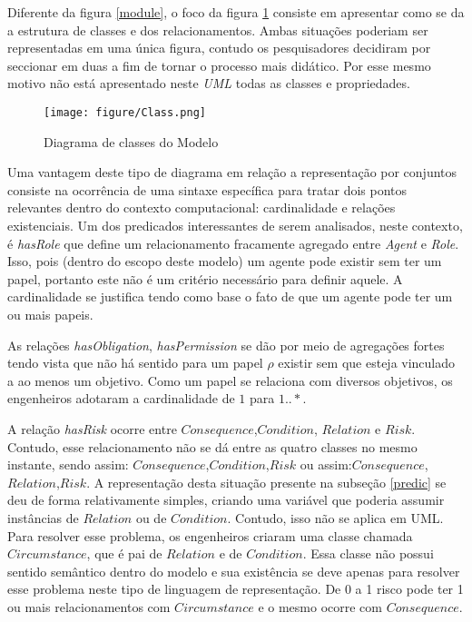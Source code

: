 Diferente da figura \ref{module}, o foco da figura \ref{classdiagrama} consiste em apresentar como se da a estrutura de classes e dos relacionamentos. Ambas situações poderiam ser representadas em uma única figura, contudo os pesquisadores decidiram por seccionar em duas a fim de tornar o processo mais didático. Por esse mesmo motivo não está apresentado neste \textit{UML} todas as classes e propriedades.  

\begin{figure}[H]
  \centering
  \texttt{[image: figure/Class.png]} 
  \caption{Diagrama de classes do Modelo }
  \label{classdiagrama}
\end{figure}

Uma vantagem deste tipo de diagrama em relação a representação por conjuntos consiste na ocorrência de uma sintaxe específica para tratar dois pontos relevantes dentro do contexto computacional: cardinalidade e relações existenciais. Um dos predicados interessantes de serem analisados, neste contexto, é \textit{hasRole} que define um relacionamento fracamente agregado entre \textit{Agent} e \textit{Role}. Isso, pois (dentro do escopo deste modelo) um agente pode existir sem ter um papel, portanto este não é um critério necessário para definir aquele. A cardinalidade se justifica tendo como base o fato de que um agente pode ter um ou mais papeis. 

As relações \textit{hasObligation}, \textit{hasPermission} se dão por meio de agregações fortes tendo vista que não há sentido para um papel $\rho$ existir sem que esteja vinculado a ao menos um objetivo. Como um papel se relaciona com diversos objetivos, os engenheiros adotaram a cardinalidade de $1$ para $1 .. *$.

A relação \textit{hasRisk} ocorre entre $Consequence$,$Condition$, $Relation$ e $Risk$. Contudo, esse relacionamento não se dá entre as quatro classes no mesmo instante, sendo assim: $Consequence$,$Condition$,$Risk$ ou assim:$Consequence$,$Relation$,$Risk$. A representação 
desta situação presente na subseção \ref{predic} se deu de forma relativamente simples, criando uma variável que poderia assumir instâncias de $Relation$ ou de $Condition$. Contudo, isso não se aplica em UML. Para resolver esse problema, os engenheiros criaram uma classe chamada $Circumstance$, que é pai de $Relation$ e de $Condition$. Essa classe não possui sentido semântico dentro do modelo e sua existência se deve apenas para resolver esse problema neste tipo de linguagem de representação. De 0 a 1 risco pode ter 1 ou mais relacionamentos com $Circumstance$ e o mesmo ocorre com $Consequence$. 

